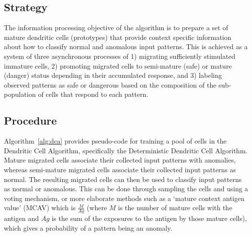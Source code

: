 \subsection{Strategy}
The information processing objective of the algorithm is to prepare a set of mature dendritic cells (prototypes) that provide context specific information about how to classify normal and anomalous input patterns.
This is achieved as a system of three asynchronous processes of 1) migrating sufficiently stimulated immature cells, 2) promoting migrated cells to semi-mature (safe) or mature (danger) status depending in their accumulated response, and 3) labeling observed patterns as safe or dangerous based on the composition of the sub-population of cells that respond to each pattern.

\subsection{Procedure}
Algorithm~\ref{alg:dca} provides pseudo-code for training a pool of cells in the Dendritic Cell Algorithm, specifically the Deterministic Dendritic Cell Algorithm. Mature migrated cells associate their collected input patterns with anomalies, whereas semi-mature migrated cells associate their collected input patterns as normal.
The resulting migrated cells can then be used to classify input patterns as normal or anomalous. This can be done through sampling the cells and using a voting mechanism, or more elaborate methods such as a `mature context antigen value' (MCAV) which is $\frac{M}{Ag}$ (where $M$ is the number of mature cells with the antigen and $Ag$ is the sum of the exposures to the antigen by those mature cells), which gives a probability of a pattern being an anomaly.

